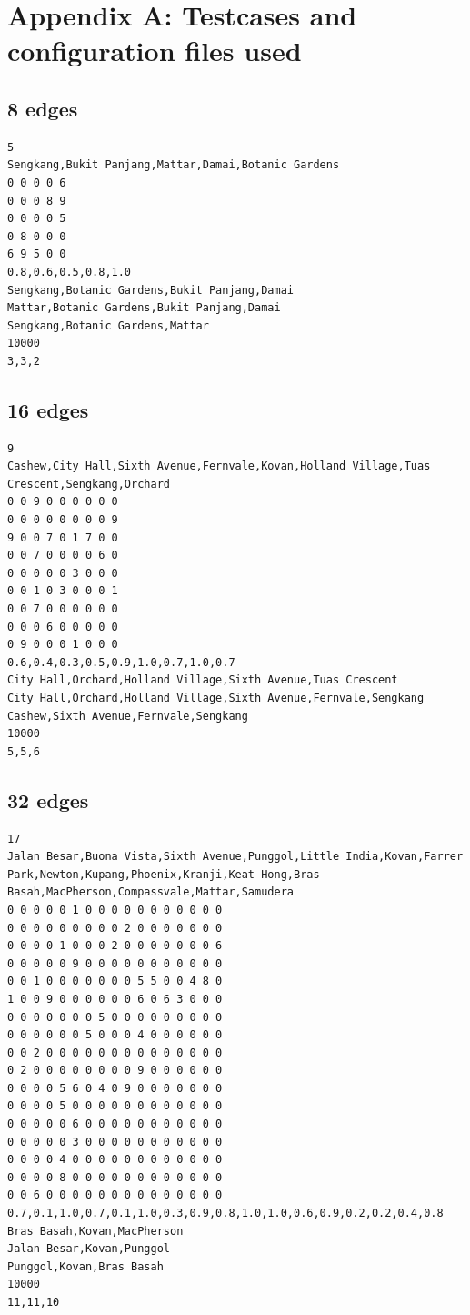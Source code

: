 \documentclass[a4paper,12pt]{article}
\begin{document}
\newpage

\section*{Appendix A: Testcases and configuration files used}
\subsection*{8 edges}
\begin{verbatim}
5
Sengkang,Bukit Panjang,Mattar,Damai,Botanic Gardens
0 0 0 0 6
0 0 0 8 9
0 0 0 0 5
0 8 0 0 0
6 9 5 0 0
0.8,0.6,0.5,0.8,1.0
Sengkang,Botanic Gardens,Bukit Panjang,Damai
Mattar,Botanic Gardens,Bukit Panjang,Damai
Sengkang,Botanic Gardens,Mattar
10000
3,3,2
\end{verbatim}
\subsection*{16 edges}
\begin{verbatim}
9
Cashew,City Hall,Sixth Avenue,Fernvale,Kovan,Holland Village,Tuas Crescent,Sengkang,Orchard
0 0 9 0 0 0 0 0 0
0 0 0 0 0 0 0 0 9
9 0 0 7 0 1 7 0 0
0 0 7 0 0 0 0 6 0
0 0 0 0 0 3 0 0 0
0 0 1 0 3 0 0 0 1
0 0 7 0 0 0 0 0 0
0 0 0 6 0 0 0 0 0
0 9 0 0 0 1 0 0 0
0.6,0.4,0.3,0.5,0.9,1.0,0.7,1.0,0.7
City Hall,Orchard,Holland Village,Sixth Avenue,Tuas Crescent
City Hall,Orchard,Holland Village,Sixth Avenue,Fernvale,Sengkang
Cashew,Sixth Avenue,Fernvale,Sengkang
10000
5,5,6
\end{verbatim}
\subsection*{32 edges}
\begin{verbatim}
17
Jalan Besar,Buona Vista,Sixth Avenue,Punggol,Little India,Kovan,Farrer Park,Newton,Kupang,Phoenix,Kranji,Keat Hong,Bras Basah,MacPherson,Compassvale,Mattar,Samudera
0 0 0 0 0 1 0 0 0 0 0 0 0 0 0 0 0
0 0 0 0 0 0 0 0 0 2 0 0 0 0 0 0 0
0 0 0 0 1 0 0 0 2 0 0 0 0 0 0 0 6
0 0 0 0 0 9 0 0 0 0 0 0 0 0 0 0 0
0 0 1 0 0 0 0 0 0 0 5 5 0 0 4 8 0
1 0 0 9 0 0 0 0 0 0 6 0 6 3 0 0 0
0 0 0 0 0 0 0 5 0 0 0 0 0 0 0 0 0
0 0 0 0 0 0 5 0 0 0 4 0 0 0 0 0 0
0 0 2 0 0 0 0 0 0 0 0 0 0 0 0 0 0
0 2 0 0 0 0 0 0 0 0 9 0 0 0 0 0 0
0 0 0 0 5 6 0 4 0 9 0 0 0 0 0 0 0
0 0 0 0 5 0 0 0 0 0 0 0 0 0 0 0 0
0 0 0 0 0 6 0 0 0 0 0 0 0 0 0 0 0
0 0 0 0 0 3 0 0 0 0 0 0 0 0 0 0 0
0 0 0 0 4 0 0 0 0 0 0 0 0 0 0 0 0
0 0 0 0 8 0 0 0 0 0 0 0 0 0 0 0 0
0 0 6 0 0 0 0 0 0 0 0 0 0 0 0 0 0
0.7,0.1,1.0,0.7,0.1,1.0,0.3,0.9,0.8,1.0,1.0,0.6,0.9,0.2,0.2,0.4,0.8
Bras Basah,Kovan,MacPherson
Jalan Besar,Kovan,Punggol
Punggol,Kovan,Bras Basah
10000
11,11,10
\end{verbatim}
\end{document}

